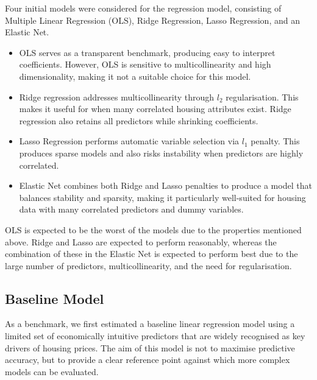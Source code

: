 \documentclass[12pt,oneside]{article} %
\begin{document}
Four initial models were considered for the regression model, consisting of Multiple Linear Regression (OLS), Ridge Regression, Lasso Regression, and an Elastic Net. 

\begin{itemize}
\item OLS serves as a transparent benchmark, producing easy to interpret coefficients. However, OLS is sensitive to multicollinearity and high dimensionality, making it not a suitable choice for this model. 
\item Ridge regression addresses multicollinearity through \({l_2}\) regularisation. This makes it useful for when many correlated housing attributes exist. Ridge regression also retains all predictors while shrinking coefficients. 
\item Lasso Regression performs automatic variable selection via \(l_1\) penalty. This produces sparse models and also risks instability when predictors are highly correlated.
\item Elastic Net combines both Ridge and Lasso penalties to produce a model that balances stability and sparsity, making it particularly well-suited for housing data with many correlated predictors and dummy variables. 
\end{itemize}
\noindent
OLS is expected to be the worst of the models due to the properties mentioned above. Ridge and Lasso are expected to perform reasonably, whereas the combination of these in the Elastic Net is expected to perform best due to the large number of predictors, multicollinearity, and the need for regularisation.


\subsection{Baseline Model}
As a benchmark, we first estimated a baseline linear regression model using a limited set of economically intuitive predictors that are widely recognised as key drivers of housing prices. The aim of this model is not to maximise predictive accuracy, but to provide a clear reference point against which more complex models can be evaluated.\\
\end{document}
